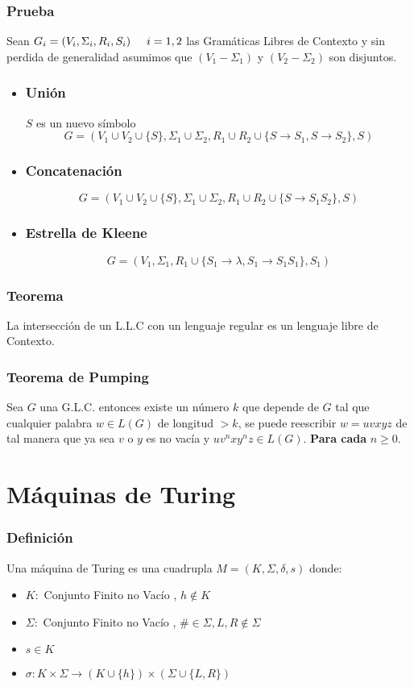 \subsubsection*{Prueba}
Sean $G_i=(V_i,\Sigma_i,R_i,S_i)\hspace{0.5cm}i=1,2$ las Gramáticas Libres de Contexto y sin perdida de generalidad asumimos que $(V_1-\Sigma_1)$ y $(V_2-\Sigma_2)$ son disjuntos. 
\begin{itemize}
\item \subsubsection*{Unión}
$S$ es un nuevo símbolo
$$
G = (V_1\cup V_2 \cup \{ S\},\Sigma_1\cup\Sigma_2,R_1\cup R_2 \cup \{S\rightarrow S_1,S\rightarrow S_2 \},S )
$$
\item \subsubsection*{Concatenación}
$$
G=(V_1 \cup V_2 \cup \{ S\} ,\Sigma_1 \cup \Sigma_2,R_1 \cup R_2 \cup \{ S\rightarrow S_1 S_2 \},S )
$$
\item \subsubsection*{Estrella de Kleene}
$$
G = (V_1,\Sigma_1,R_1 \cup \{S_1\rightarrow\lambda, S_1 \rightarrow S_1 S_1 \} ,S_1)
$$
\end{itemize}
\subsubsection*{Teorema}
La intersección de un L.L.C con un lenguaje regular es un lenguaje libre de Contexto.
\subsubsection{Teorema de Pumping}
Sea $G$ una G.L.C. entonces existe un número $k$ que depende de $G$ tal que cualquier palabra $w\in L(G)$ de longitud $>k$, se puede reescribir $w=uvxyz$ de tal manera que ya sea $v$ o $y$ es no vacía y $uv^n xy^n z\in L(G)$. \textbf{Para cada} $n\geq 0$.
\section{Máquinas de Turing}
\subsubsection*{Definición}
Una máquina de Turing es una cuadrupla $M=(K,\Sigma,\delta,s)$ donde:
\begin{itemize}
\item $K:$ Conjunto Finito no Vacío , $h\notin K$
\item $\Sigma:$ Conjunto Finito no Vacío , $\#\in\Sigma , L,R\notin\Sigma$
\item $s\in K$
\item $\sigma: K\times\Sigma \rightarrow (K\cup\{h\}) \times (\Sigma\cup\{L,R\})$
\end{itemize}


